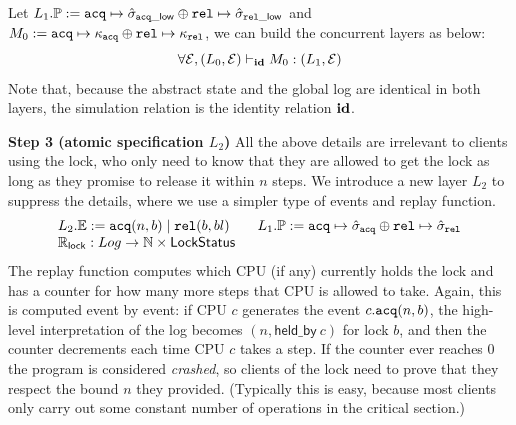 {%

Let $L_1.\mathbb{P} := {\texttt{acq}} \mapsto \hat{\sigma}_{{\texttt{acq}}\_\mathsf{low}}
\oplus {\texttt{rel}} \mapsto \hat{\sigma}_{{\texttt{rel}}\_\mathsf{low}}$
 and  $M_0 := {\texttt{acq}} \mapsto \kappa_{{\texttt{acq}}}
\oplus {\texttt{rel}} \mapsto \kappa_{{\texttt{rel}}}$,
we can build the concurrent layers as below:
\[
\forall \mathcal{E}, 
(L_0, \mathcal{E}) \vdash_{\textbf{id}} M_0 : (L_1, \mathcal{E})
\]%
Note that,
because the abstract state and the global log are identical
in both layers, the simulation relation is the identity relation $\textbf{id}$.

\vspace{3pt}
\noindent\textbf{Step 3 (atomic specification $L_2$)}
All the above details are irrelevant to clients using the lock, who only
need to know that they are allowed to get the lock as long as they
promise to release it within $n$ steps. We introduce a new layer $L_2$ to
suppress the details, where we use a simpler type of events and replay function.
{\small
\[
\begin{array}{l}
L_2.\mathbb{E} := {\texttt{acq}}(n,b) \mid {\texttt{rel}}(b,bl)
\qquad
L_1.\mathbb{P} := {\texttt{acq}} \mapsto \hat{\sigma}_{{\texttt{acq}}}
\oplus {\texttt{rel}} \mapsto \hat{\sigma}_{{\texttt{rel}}}\\
\mathbb{R}_\mathsf{lock} : Log \to \mathbb{N} \times
\mathsf{LockStatus}
\end{array}
\]}%
The replay function computes which CPU (if any) currently holds the
lock and has a counter for how many more steps that CPU is allowed
to take. Again, this is computed event by event: if CPU $c$
generates the event $c.{\texttt{acq}}(n,b)$, the high-level interpretation of the
log becomes $(n, \mathsf{held\_by}\ c)$ for lock $b$, and then 
 the counter decrements each time CPU $c$ takes a step. 
 If the counter
ever reaches $0$ the program is considered \emph{crashed}, so clients of the
lock need to prove that they respect the bound $n$ they
provided. (Typically this is easy, because most clients only carry out
some constant number of operations in the critical section.)

}
